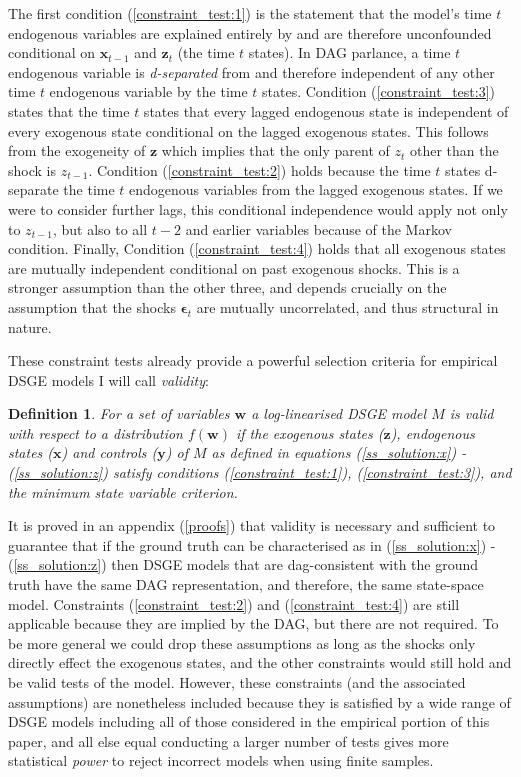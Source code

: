 \documentclass{article}
\newtheorem{definition}{Definition}
\begin{document}
The first condition (\ref{constraint_test:1}) is the statement that the model's time $t$ endogenous variables are explained entirely by and are therefore unconfounded conditional on $\mathbf{x}_{t-1}$ and $\mathbf{z}_t$ (the time $t$ states). In DAG parlance, a time $t$ endogenous variable is \textit{d-separated} from and therefore independent of any other time $t$ endogenous variable by the time $t$ states. Condition (\ref{constraint_test:3}) states that the time $t$ states that every lagged endogenous state is independent of every exogenous state conditional on the lagged exogenous states. This follows from the exogeneity of $\mathbf{z}$ which implies that the only parent of $z_t$ other than the shock is $z_{t-1}$. Condition (\ref{constraint_test:2}) holds because the time $t$ states d-separate the time $t$ endogenous variables from the lagged exogenous states. If we were to consider further lags, this conditional independence would apply not only to $z_{t-1}$, but also to all $t-2$ and earlier variables because of the Markov condition. Finally, Condition (\ref{constraint_test:4}) holds that all exogenous states are mutually independent conditional on past exogenous shocks. This is a stronger assumption than the other three, and depends crucially on the assumption that the shocks $\mathbf{\epsilon}_t$ are mutually uncorrelated, and thus structural in nature.

These constraint tests already provide a powerful selection criteria for empirical DSGE models I will call \textit{validity}:

\begin{definition}
  For a set of variables $\mathbf{w}$ a log-linearised DSGE model $M$ is \textit{valid} with respect to a distribution $f(\mathbf{w})$ if the exogenous states ($\mathbf{z}$), endogenous states ($\mathbf{x}$) and controls ($\mathbf{y}$) of $M$ as defined in equations (\ref{ss_solution:x}) - (\ref{ss_solution:z}) satisfy conditions (\ref{constraint_test:1}), (\ref{constraint_test:3}), and the minimum state variable criterion.
  \label{validity}
\end{definition}

It is proved in an appendix (\ref{proofs}) that validity is necessary and sufficient to guarantee that if the ground truth can be characterised as in (\ref{ss_solution:x}) - (\ref{ss_solution:z}) then DSGE models that are dag-consistent with the ground truth have the same DAG representation, and therefore, the same state-space model. Constraints (\ref{constraint_test:2}) and (\ref{constraint_test:4}) are still applicable because they are implied by the DAG, but there are not required. To be more general we could drop these assumptions as long as the shocks only directly effect the exogenous states, and the other constraints would still hold and be valid tests of the model. However, these constraints (and the associated assumptions) are nonetheless included because they is satisfied by a wide range of DSGE models including all of those considered in the empirical portion of this paper, and all else equal conducting a larger number of tests gives more statistical \textit{power} to reject incorrect models when using finite samples.
\end{document}
